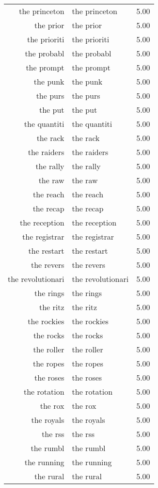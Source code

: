 \begin{table}[ht]
\begin{tabular}{rlr}
  the princeton & the princeton & 5.00 \\ 
  the prior & the prior & 5.00 \\ 
  the prioriti & the prioriti & 5.00 \\ 
  the probabl & the probabl & 5.00 \\ 
  the prompt & the prompt & 5.00 \\ 
  the punk & the punk & 5.00 \\ 
  the purs & the purs & 5.00 \\ 
  the put & the put & 5.00 \\ 
  the quantiti & the quantiti & 5.00 \\ 
  the rack & the rack & 5.00 \\ 
  the raiders & the raiders & 5.00 \\ 
  the rally & the rally & 5.00 \\ 
  the raw & the raw & 5.00 \\ 
  the reach & the reach & 5.00 \\ 
  the recap & the recap & 5.00 \\ 
  the reception & the reception & 5.00 \\ 
  the registrar & the registrar & 5.00 \\ 
  the restart & the restart & 5.00 \\ 
  the revers & the revers & 5.00 \\ 
  the revolutionari & the revolutionari & 5.00 \\ 
  the rings & the rings & 5.00 \\ 
  the ritz & the ritz & 5.00 \\ 
  the rockies & the rockies & 5.00 \\ 
  the rocks & the rocks & 5.00 \\ 
  the roller & the roller & 5.00 \\ 
  the ropes & the ropes & 5.00 \\ 
  the roses & the roses & 5.00 \\ 
  the rotation & the rotation & 5.00 \\ 
  the rox & the rox & 5.00 \\ 
  the royals & the royals & 5.00 \\ 
  the rss & the rss & 5.00 \\ 
  the rumbl & the rumbl & 5.00 \\ 
  the running & the running & 5.00 \\ 
  the rural & the rural & 5.00 \\ 

\end{tabular}
\end{table}
